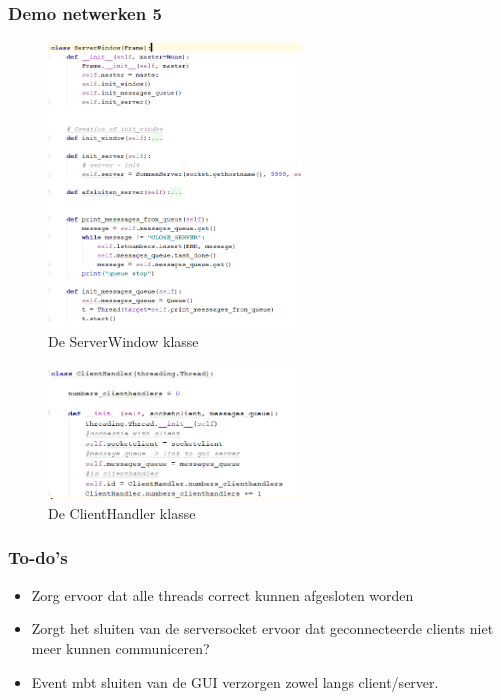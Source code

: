 \documentclass{article}
\begin{document}
\subsubsection{Demo netwerken 5}

\begin{figure}[H]
    \centering
    \includegraphics[width=0.6\textwidth]{multithreaded-server-gui-python.png}
    \caption{De ServerWindow klasse}
\end{figure}

\begin{figure}[H]
    \centering
    \includegraphics[width=0.6\textwidth]{multithreaded-server-gui-python2.png}
    \caption{De ClientHandler klasse}
\end{figure}

\subsubsection{To-do's}

\begin{itemize}
    \item Zorg ervoor dat alle threads correct kunnen afgesloten worden
    \item Zorgt het sluiten van de serversocket ervoor dat geconnecteerde clients niet meer kunnen communiceren?
    \item Event mbt sluiten van de GUI verzorgen zowel langs client/server.
\end{itemize}
\end{document}
